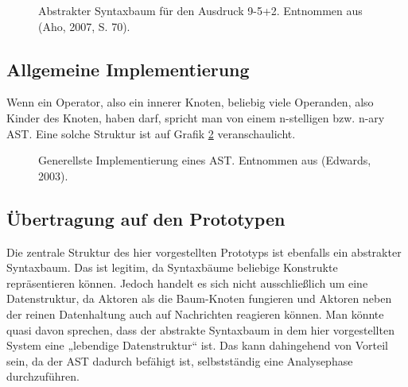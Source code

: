  
\begin{figure}[h!]
\centering
\advance\leftskip-2.5cm
\caption[Abstrakter Syntaxbaum Beispiel]{ Abstrakter Syntaxbaum für den Ausdruck 9-5+2. Entnommen aus (Aho, 2007, S. 70). }\label{ast}
\end{figure}
 
\subsection{Allgemeine Implementierung}\label{}
 
Wenn ein Operator, also ein innerer Knoten, beliebig viele Operanden, also Kinder des Knoten, haben darf, spricht man von einem n-stelligen bzw. n-ary AST. \citep{Edwards} Eine solche Struktur ist auf Grafik \ref{astimpl} veranschaulicht.

 
\begin{figure}[h!]
\centering
\advance\leftskip-2.5cm
\caption[Generellste Implementierung eines AST]{ Generellste Implementierung eines AST. Entnommen aus (Edwards, 2003). }\label{astimpl}
\end{figure}
 
\subsection{Übertragung auf den Prototypen}\label{}
 
Die zentrale Struktur des hier vorgestellten Prototyps ist ebenfalls ein abstrakter Syntaxbaum. Das ist legitim, da Syntaxbäume beliebige Konstrukte repräsentieren können. Jedoch handelt es sich nicht ausschließlich um eine Datenstruktur, da Aktoren als die Baum-Knoten fungieren und Aktoren neben der reinen Datenhaltung auch auf Nachrichten reagieren können. Man könnte quasi davon sprechen, dass der abstrakte Syntaxbaum in dem hier vorgestellten System eine „lebendige Datenstruktur“ ist. Das kann dahingehend von Vorteil sein, da der AST dadurch befähigt ist, selbstständig eine Analysephase durchzuführen.

